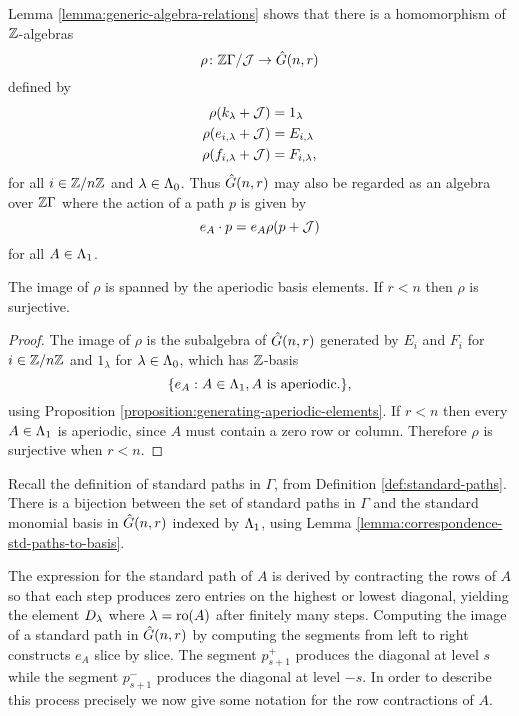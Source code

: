 \documentclass[a4paper, 11pt, twoside]{report}
\begin{document}
Lemma \ref{lemma:generic-algebra-relations} shows that there is a homomorphism of $\mathbb{Z}$-algebras
\begin{equation*}
\rho\colon\mathbb{Z}\Gamma/{\mathcal{J}}\to\hat{G}(n,r)
\end{equation*}
defined by
\begin{align*}
\rho(k_\lambda +\mathcal{J}) &= 1_\lambda\\
\rho(e_{i,\lambda} +\mathcal{J}) &= E_{i,\lambda}\\
\rho(f_{i,\lambda} +\mathcal{J}) &= F_{i,\lambda},
\end{align*}
for all $i\in\mathbb{Z}/{n \mathbb{Z}}$ and $\lambda\in\Lambda_0{}$. Thus $\hat{G}(n,r)$ may also be regarded as an algebra over $\mathbb{Z}\Gamma$ where the action of a path $p$ is given by
\begin{equation*}
e_A\cdot p = e_A\rho(p+\mathcal{J})
\end{equation*}
for all $A\in\Lambda_1{}$.

\begin{proposition}\label{proposition:image-of-quiver-algebra-generic}
The image of $\rho$ is spanned by the aperiodic basis elements. If $r<n$ then $\rho$ is surjective.
\end{proposition}

\begin{proof}
The image of $\rho$ is the subalgebra of $\hat{G}(n,r)$ generated by $E_i$ and $F_i$ for $i\in\mathbb{Z}/{n \mathbb{Z}}$ and $1_\lambda$ for $\lambda\in\Lambda_0{}$, which has $\mathbb{Z}$-basis
\begin{equation*}
\{e_A:A\in\Lambda_1{}, A\text{ is aperiodic.}\},
\end{equation*}
using Proposition \ref{proposition:generating-aperiodic-elements}. If $r<n$ then every $A\in\Lambda_1{}$ is aperiodic, since $A$ must contain a zero row or column. Therefore $\rho$ is surjective when $r<n$.
\end{proof}

Recall the definition of standard paths in $\Gamma$, from Definition \ref{def:standard-paths}. There is a bijection between the set of standard paths in $\Gamma$ and the standard monomial basis in $\hat{G}(n,r)$ indexed by $\Lambda_1{}$, using Lemma \ref{lemma:correspondence-std-paths-to-basis}.

The expression for the standard path of $A$ is derived by contracting the rows of $A$ so that each step produces zero entries on the highest or lowest diagonal, yielding the element $D_{\lambda}$ where $\lambda=\operatorname{ro}(A)$ after finitely many steps. Computing the image of a standard path in $\hat{G}(n,r)$ by computing the segments from left to right constructs $e_A$ slice by slice. The segment $p_{s+1}^+$ produces the diagonal at level $s$ while the segment $p_{s+1}^-$ produces the diagonal at level $-s$. In order to describe this process precisely we now give some notation for the row contractions of $A$.
\end{document}
